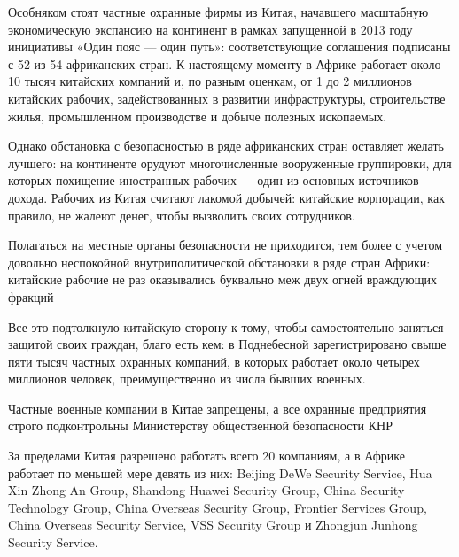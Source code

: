 Особняком стоят частные охранные фирмы из Китая, начавшего масштабную экономическую экспансию на континент в рамках запущенной в 2013 году инициативы «Один пояс — один путь»: соответствующие соглашения подписаны с 52 из 54 африканских стран. К настоящему моменту в Африке работает около 10 тысяч китайских компаний и, по разным оценкам, от 1 до 2 миллионов китайских рабочих, задействованных в развитии инфраструктуры, строительстве жилья, промышленном производстве и добыче полезных ископаемых.

Однако обстановка с безопасностью в ряде африканских стран оставляет желать лучшего: на континенте орудуют многочисленные вооруженные группировки, для которых похищение иностранных рабочих — один из основных источников дохода. Рабочих из Китая считают лакомой добычей: китайские корпорации, как правило, не жалеют денег, чтобы вызволить своих сотрудников.

\begin{center}
    \Large
    Полагаться на местные органы безопасности не приходится, тем более с учетом довольно неспокойной внутриполитической обстановки в ряде стран Африки: китайские рабочие не раз оказывались буквально меж двух огней враждующих фракций
\end{center}

Все это подтолкнуло китайскую сторону к тому, чтобы самостоятельно заняться защитой своих граждан, благо есть кем: в Поднебесной зарегистрировано свыше пяти тысяч частных охранных компаний, в которых работает около четырех миллионов человек, преимущественно из числа бывших военных.

\begin{center}
    \Large
    Частные военные компании в Китае запрещены, а все охранные предприятия строго подконтрольны Министерству общественной безопасности КНР
\end{center}

За пределами Китая разрешено работать всего 20 компаниям, а в Африке работает по меньшей мере девять из них: Beijing DeWe Security Service, Hua Xin Zhong An Group, Shandong Huawei Security Group, China Security Technology Group, China Overseas Security Group, Frontier Services Group, China Overseas Security Service, VSS Security Group и Zhongjun Junhong Security Service.


